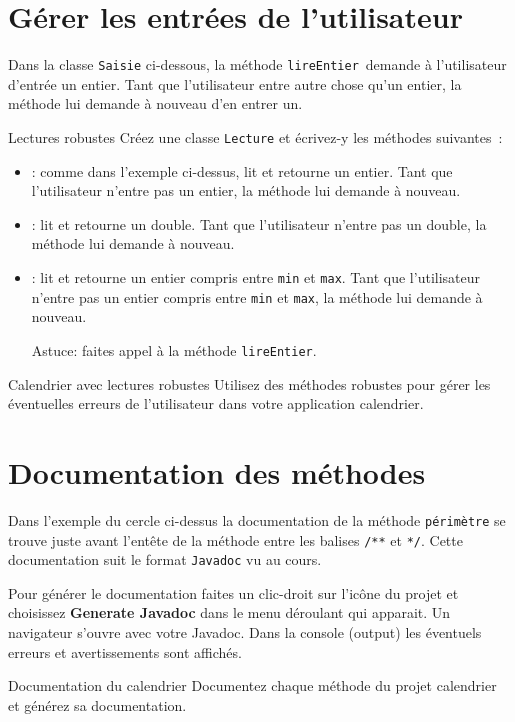 \documentclass[a4paper,11pt]{article}
\begin{document}
\section{Gérer les entrées de l'utilisateur}

	Dans la classe \texttt{Saisie} ci-dessous, la méthode \texttt{lireEntier} demande à l'utilisateur d'entrée un entier.
	Tant que l'utilisateur entre autre chose qu'un entier, la méthode lui demande à nouveau d'en entrer un. 
	

	
	
	\begin{Exercice}{Lectures robustes}
		Créez une classe \texttt{Lecture} et écrivez-y les méthodes suivantes~:
		\begin{itemize}
			\item {}: comme dans l'exemple ci-dessus, lit et retourne un entier.
				Tant que l'utilisateur n'entre pas un entier, la méthode lui demande à nouveau.
			\item {}: lit et retourne un double.
				Tant que l'utilisateur n'entre pas un double, la méthode lui demande à nouveau.
			\item {}: lit et retourne un entier 
				compris entre \texttt{min} et \texttt{max}.
				Tant que l'utilisateur n'entre pas un entier compris entre \texttt{min} et \texttt{max}, 
				la méthode lui demande à nouveau.
				
				Astuce: faites appel à la méthode \texttt{lireEntier}.
		\end{itemize}
	\end{Exercice}
	
	\begin{Exercice}{Calendrier avec lectures robustes}
		Utilisez des méthodes robustes pour gérer les éventuelles erreurs de l'utilisateur dans votre application calendrier.
	\end{Exercice}


\section{Documentation des méthodes}

	Dans l'exemple du cercle ci-dessus la documentation de la méthode \texttt{périmètre} 
	se trouve juste avant l'entête de la méthode entre les balises \texttt{/**} et \texttt{*/}.
	Cette documentation suit le format \texttt{Javadoc} vu au cours.
	
	Pour générer le documentation faites un clic-droit sur l'icône du projet et choisissez 
	\textbf{Generate Javadoc} dans le menu déroulant qui apparait. 
	Un navigateur s'ouvre avec votre Javadoc. Dans la console (output) les éventuels 
	erreurs et avertissements sont affichés.

	\begin{Exercice}{Documentation du calendrier}
		Documentez chaque méthode du projet calendrier et générez sa documentation.
	\end{Exercice}

	
				
\end{document}
